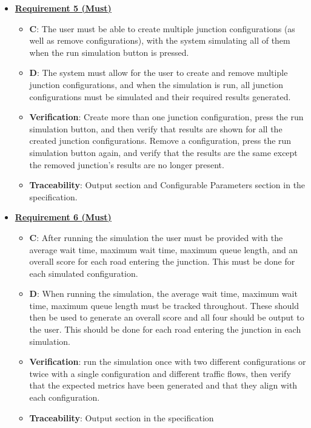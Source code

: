 \documentclass{article}
\begin{document}
\begin{itemize}
    \item \textbf{\underline{Requirement 5 (Must)}}
    \begin{itemize}
        \item \textbf{C}: The user must be able to create multiple junction configurations (as 
        well as remove configurations), with the system simulating all of them when the run 
        simulation button is pressed.
        \item \textbf{D}: The system must allow for the user to create and remove multiple 
        junction configurations, and when the simulation is run, all junction configurations 
        must be simulated and their required results generated.
        \item \textbf{Verification}: Create more than one junction configuration, press the run 
        simulation button, and then verify that results are shown for all the created junction 
        configurations. Remove a configuration, press the run simulation button again, and verify 
        that the results are the same except the removed junction's results are no longer present.
        \item\textbf{Traceability}: Output section and Configurable Parameters section in the specification.
    \end{itemize}

    \item \textbf{\underline{Requirement 6 (Must)}}
    \begin{itemize}
        \item \textbf{C}: After running the simulation the user must be provided with the average 
            wait time, maximum wait time, maximum queue length, and an overall score for each road 
            entering the junction. This must be done for each simulated configuration.
        \item \textbf{D}: When running the simulation, the average wait time, maximum wait time, 
            maximum queue length must be tracked throughout. These should then be used to generate 
            an overall score and all four should be output to the user. This should be done for each 
            road entering the junction in each simulation.
        \item \textbf{Verification}: run the simulation once with two different configurations 
            or twice with a single configuration and different traffic flows, then verify 
            that the expected metrics have been generated and that they align with each configuration.
        \item\textbf{Traceability}: Output section in the specification
    \end{itemize}


\end{itemize}
\end{document}
